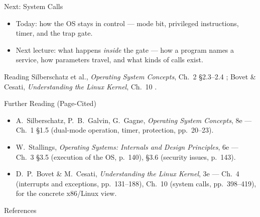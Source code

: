 \documentclass[aspectratio=169]{beamer}
\begin{document}
\begin{frame}{Next: System Calls}
  \begin{itemize}
    \item Today: how the OS stays in control --- mode bit, privileged
      instructions, timer, and the trap gate.
    \item Next lecture: what happens \emph{inside} the gate --- how a program
      names a service, how parameters travel, and what kinds of calls exist.
  \end{itemize}
  \vspace{0.3cm}
  \begin{block}{Reading}
    Silberschatz et al., \emph{Operating System Concepts}, Ch.~2
    \S2.3--2.4 \cite{SilberschatzOSC_operating_system_concepts}; Bovet \&
    Cesati, \emph{Understanding the Linux Kernel}, Ch.~10
    \cite{BovetCesati_understanding_linux_kernel}.
  \end{block}
\end{frame}

\begin{frame}{Further Reading (Page-Cited)}
  \footnotesize
  \begin{itemize}
    \item A.~Silberschatz, P.~B.~Galvin, G.~Gagne, \emph{Operating System
      Concepts}, 8e --- Ch.~1 \S1.5 (dual-mode operation, timer, protection,
      pp.~20--23).
    \item W.~Stallings, \emph{Operating Systems: Internals and Design
      Principles}, 6e --- Ch.~3 \S3.5 (execution of the OS, p.~140), \S3.6
      (security issues, p.~143).
    \item D.~P.~Bovet \& M.~Cesati, \emph{Understanding the Linux Kernel}, 3e
      --- Ch.~4 (interrupts and exceptions, pp.~131--188), Ch.~10 (system
      calls, pp.~398--419), for the concrete x86/Linux view.
  \end{itemize}
  \vspace{0.2cm}
\end{frame}

\begin{frame}[allowframebreaks]{References}
  \footnotesize
  
  
\end{frame}
\end{document}
